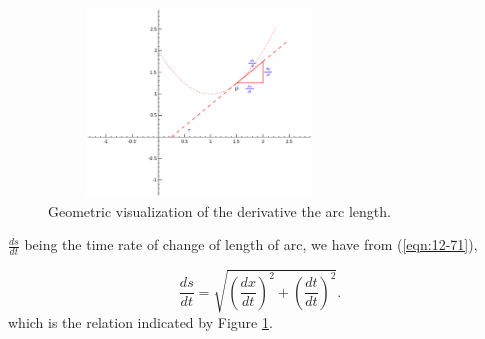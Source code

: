 \begin{figure}[h!]
\begin{minipage}{\textwidth}
\begin{center}
\includegraphics[height=5cm,width=8cm]{arclength.eps}
\end{center}
\end{minipage}
\caption{Geometric visualization of the derivative the arc length.}
\label{fig:two-rates}
\end{figure}

\noindent
$\frac{ds}{dt}$ being the time rate of change of length 
of arc, we have from (\ref{eqn:12-71}), %

\begin{equation}
\frac{ds}{dt} 
= \sqrt{\left ( \frac{dx}{dt} \right )^2 + \left ( \frac{dt}{dt} \right )^2}.
\label{eqn:34-94}
\end{equation}
which is the relation indicated by Figure \ref{fig:two-rates}.

